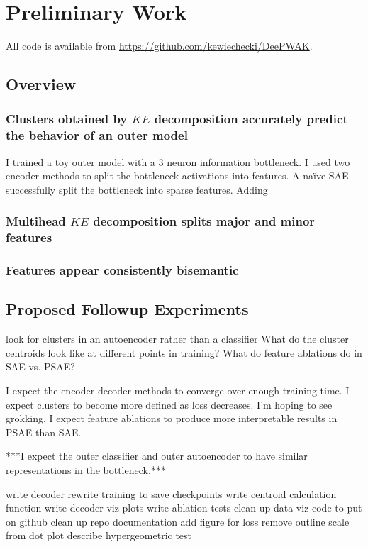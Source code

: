 \section{Preliminary Work}

All code is available from \url{https://github.com/kewiechecki/DeePWAK}. 

\subsection{Overview}
\subsubsection{Clusters obtained by $KE$ decomposition accurately predict the behavior of an outer model}
I trained a toy outer model with a 3 neuron information bottleneck.
I used two encoder methods to split the bottleneck activations into features.
A na\"ive SAE successfully split the bottleneck into sparse features.
Adding 
\subsubsection{Multihead $KE$ decomposition splits major and minor features}

\subsubsection{Features appear consistently bisemantic}

\subsection{Proposed Followup Experiments}
look for clusters in an autoencoder rather than a classifier
What do the cluster centroids look like at different points in training?
What do feature ablations do in SAE vs. PSAE?

I expect the encoder-decoder methods to converge over enough training time.
I expect clusters to become more defined as loss decreases.
I'm hoping to see grokking.
I expect feature ablations to produce more interpretable results in PSAE than SAE.

***I expect the outer classifier and outer autoencoder to have similar representations in the bottleneck.***

write decoder
rewrite training to save checkpoints
write centroid calculation function
write decoder viz plots
write ablation tests
clean up data viz code to put on github
clean up repo documentation
add figure for loss
remove outline scale from dot plot
describe hypergeometric test




